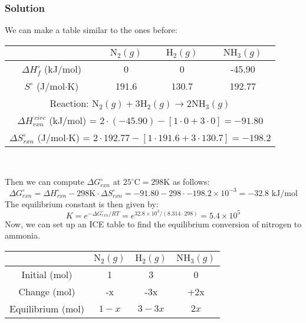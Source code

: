 \documentclass[12pt]{article}
\begin{document}
\subsubsection{Solution}
We can make a table similar to the ones before:
\begin{center}
\begin{tabular}{|c|c|c|c|}
\hline
    & $\mathrm{N_{2}}(g)$ & $\mathrm{H_{2}}(g)$ & $\mathrm{NH_{3}}(g)$ \\
\hline
$\Delta H_{f}^{\circ}$ (kJ/mol) & 0 & 0 & -45.90 \\
\hline
$S^{\circ}$ (J/mol$\cdot$K) & 191.6 & 130.7 & 192.77 \\
\hline
\multicolumn{4}{|c|}{Reaction: $\mathrm{N}_{2}(g)+3 \mathrm{H}_{2}(g) \rightarrow 2 \mathrm{NH}_{3}(g)$} \\
\hline
\multicolumn{4}{|c|}{$\Delta H_{rxn}^{\
circ}$ (kJ/mol) = $2 \cdot (-45.90) - [1 \cdot 0 + 3 \cdot 0] = -91.80 $} \\
\hline
\multicolumn{4}{|c|}{$\Delta S_{rxn}^{\circ}$ (J/mol$\cdot$K) = $2 \cdot 192.
77 - [1 \cdot 191.6 + 3 \cdot 130.7] = -198.2$} \\
\hline
\end{tabular}\\
\end{center}
Then we can compute $\Delta G_{rxn}^{\circ}$ at $25^{\circ} \mathrm{C}=298 \mathrm{K}$ as follows:
\begin{equation}
\Delta G_{rxn}^{\circ} = \Delta H_{rxn}^{\circ} - 298 \mathrm{K} \cdot \Delta S_{rxn}^{\circ} = -91.80 - 298 \cdot -198.2 \times 10^{-3} = -32.8 \text{ kJ/mol}
\end{equation}
The equilibrium constant is then given by:
\begin{equation}
K = e^{-\Delta G_{rxn}^{\circ}/RT} = e^{32.8 \times 10^{3}/(8.314 \cdot 298)} = 5.4 \times 10^{5}
\end{equation}
Now, we can set up an ICE table to find the equilibrium conversion of nitrogen to ammonia.
\begin{center}
\begin{tabular}{|c|c|c|c|}
\hline
    & $\mathrm{N_{2}}(g)$ & $\mathrm{H_{2}}(g)$ & $\mathrm{NH_{3}}(g)$ \\
\hline
Initial (mol) & 1 & 3 & 0 \\
\hline
Change (mol) & -x & -3x & +2x \\
\hline
Equilibrium (mol) & $1-x$ & $3-3x$ & $2x$ \\
\hline
\end{tabular}\\
\end{center}
\end{document}
